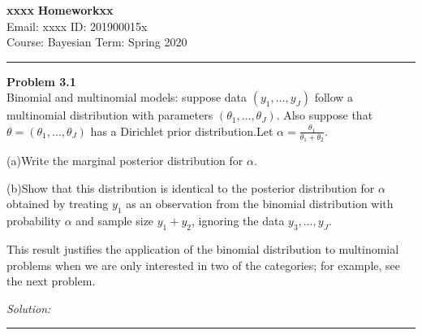 \documentclass[a4paper, 11pt]{article}
\newenvironment{problem}[2][Problem]
    { \begin{mdframed}[backgroundcolor=gray!20] \textbf{#1 #2} \\}
    {  \end{mdframed}}
\newenvironment{solution}
    {\textit{Solution:}}
    {}
\begin{document}
\noindent
\large\textbf{xxxx} \hfill \textbf{Homeworkxx}   \\
Email: xxxx \hfill ID: 201900015x \\
\normalsize Course: Bayesian \hfill Term: Spring 2020\\
\noindent\rule{7in}{2.8pt}



\begin{problem}{3.1}
Binomial and multinomial models: suppose data $(y_1,\dots,y_J)$ follow a multinomial distribution with parameters $(\theta_1,\dots,\theta_J)$.
Also suppose that $\theta = (\theta_1,\dots,\theta_J)$ has a Dirichlet prior distribution.Let $\alpha =\frac{\theta_1}{\theta_1+\theta_2}$.

(a)Write the marginal posterior distribution for $\alpha$.

(b)Show that this distribution is identical to the posterior distribution for $\alpha$ obtained by treating $y_1$ as an observation from the binomial 
  distribution with probability $\alpha$ and sample size $y_1 + y_2$, ignoring the data $y_3,\dots,y_J$.

This result justifies the application of the binomial distribution to multinomial problems when we are only interested in two of the categories;
for example, see the next problem.
\end{problem}
\begin{solution}

\end{solution}

\noindent\rule{7in}{2.8pt}
\end{document}
